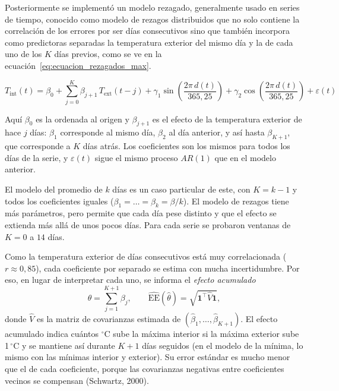 \documentclass[11pt,a4paper]{article}
\begin{document}
Posteriormente se implementó un modelo rezagado, generalmente usado en series de tiempo, conocido como modelo de rezagos distribuidos que no solo contiene la correlación de los errores por ser días consecutivos sino que también incorpora como predictoras separadas la temperatura exterior del mismo día y la de cada uno de los $K$ días previos, como se ve en la ecuación~\ref{eq:ecuacion_rezagados_max}.

\begin{equation}
T_{\text{int}}(t) = \beta_0 + \sum_{j=0}^{K} \beta_{j+1}\, T_{\text{ext}}(t-j) + \gamma_1 \sin\left(\frac{2\pi\, d(t)}{365{,}25}\right) + \gamma_2 \cos\left(\frac{2\pi\, d(t)}{365{,}25}\right) + \varepsilon(t)
\label{eq:ecuacion_rezagados_max}
\end{equation}

Aquí $\beta_0$ es la ordenada al origen y $\beta_{j+1}$ es el efecto de la temperatura exterior de hace $j$ días: $\beta_1$ corresponde al mismo día, $\beta_2$ al día anterior, y así hasta $\beta_{K+1}$, que corresponde a $K$ días atrás. Los coeficientes son los mismos para todos los días de la serie, y $\varepsilon(t)$ sigue el mismo proceso $AR(1)$ que en el modelo anterior.

El modelo del promedio de $k$ días es un caso particular de este, con $K = k-1$ y todos los coeficientes iguales ($\beta_1 = \dots = \beta_k = \beta/k$). El modelo de rezagos tiene más parámetros, pero permite que cada día pese distinto y que el efecto se extienda más allá de unos pocos días. Para cada serie se probaron ventanas de $K = 0$ a $14$ días.

Como la temperatura exterior de días consecutivos está muy correlacionada ($r \approx 0{,}85$), cada coeficiente por separado se estima con mucha incertidumbre. Por eso, en lugar de interpretar cada uno, se informa el \textit{efecto acumulado}
\begin{equation}
\theta = \sum_{j=1}^{K+1} \beta_j, \qquad \widehat{\mathrm{EE}}(\hat\theta) = \sqrt{\mathbf{1}^\top \hat V \mathbf{1}},
\label{eq:efecto_acumulado}
\end{equation}
donde $\hat V$ es la matriz de covarianzas estimada de $(\hat\beta_1, \dots, \hat\beta_{K+1})$. El efecto acumulado indica cuántos $^\circ$C sube la máxima interior si la máxima exterior sube 1\,$^\circ$C y se mantiene así durante $K+1$ días seguidos (en el modelo de la mínima, lo mismo con las mínimas interior y exterior). Su error estándar es mucho menor que el de cada coeficiente, porque las covarianzas negativas entre coeficientes vecinos se compensan (Schwartz, 2000).
\end{document}
